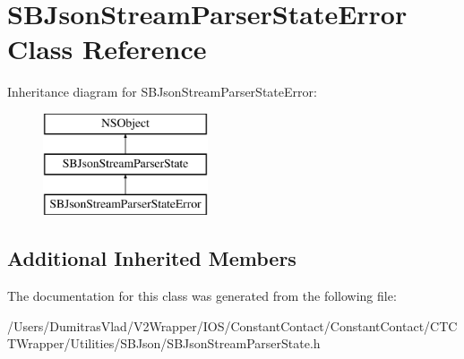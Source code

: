 \hypertarget{interface_s_b_json_stream_parser_state_error}{\section{S\-B\-Json\-Stream\-Parser\-State\-Error Class Reference}
\label{interface_s_b_json_stream_parser_state_error}
}
Inheritance diagram for S\-B\-Json\-Stream\-Parser\-State\-Error\-:\begin{figure}[H]
\begin{center}
\leavevmode
\includegraphics[height=3.000000cm]{interface_s_b_json_stream_parser_state_error}
\end{center}
\end{figure}
\subsection*{Additional Inherited Members}


The documentation for this class was generated from the following file\-:\begin{DoxyCompactItemize}
\item 
/\-Users/\-Dumitras\-Vlad/\-V2\-Wrapper/\-I\-O\-S/\-Constant\-Contact/\-Constant\-Contact/\-C\-T\-C\-T\-Wrapper/\-Utilities/\-S\-B\-Json/S\-B\-Json\-Stream\-Parser\-State.\-h\end{DoxyCompactItemize}
